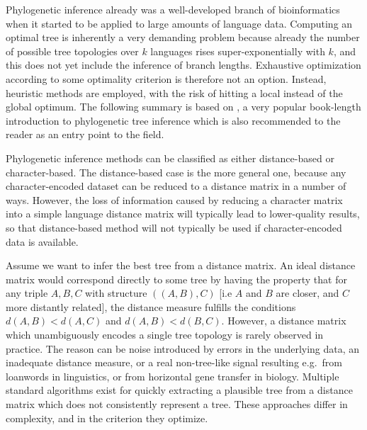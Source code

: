 Phylogenetic inference already was a well-developed branch of bioinformatics when it started to be applied to large amounts of language data. Computing an optimal tree is inherently a very demanding problem because already the number of possible tree topologies over $k$ languages rises super-exponentially with $k$, and this does not yet include the inference of branch lengths. Exhaustive optimization according to some optimality criterion is therefore not an option. Instead, heuristic methods are employed, with the risk of hitting a local instead of the global optimum. The following summary is based on \citet{felsenstein2004}, a very popular book-length introduction to phylogenetic tree inference which is also recommended to the reader as an entry point to the field.

\newpage 
Phylogenetic inference methods can be classified as either distance-based or character-based. The distance-based case is the more general one, because any character-encoded dataset can be reduced to a distance matrix in a number of ways. However, the loss of information caused by reducing a character matrix into a simple language distance matrix will typically lead to lower-quality results, so that distance-based method will not typically be used if character-encoded data is available.

Assume we want to infer the best tree from a distance matrix. An ideal distance matrix would correspond directly to some tree by having the property that for any triple $A,B,C$ with structure $((A,B),C)$ [i.e $A$ and $B$ are closer, and $C$ more distantly related], the distance measure fulfills the conditions $d(A,B) < d(A,C)$ and $d(A,B) < d(B,C)$. However, a distance matrix which unambiguously encodes a single tree topology is rarely observed in practice. The reason can be noise introduced by errors in the underlying data, an inadequate distance measure, or a real non-tree-like signal resulting e.g.\ from loanwords in linguistics, or from horizontal gene transfer in biology. Multiple standard algorithms exist for quickly extracting a plausible tree from a distance matrix which does not consistently represent a tree. These approaches differ in complexity, and in the criterion they optimize.

